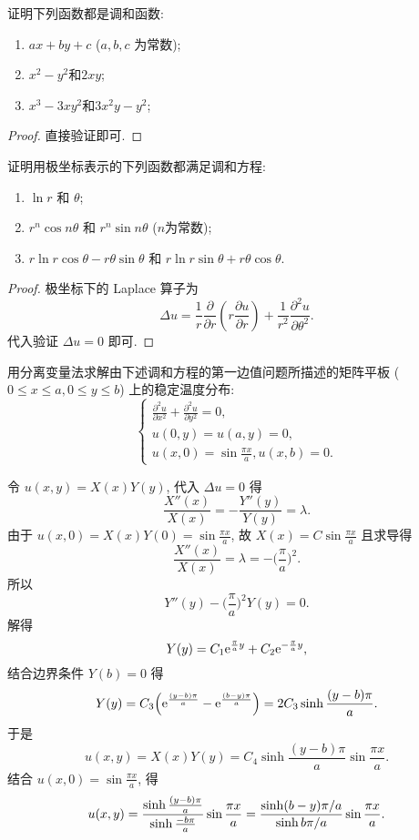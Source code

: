 \begin{exercise}
  证明下列函数都是调和函数:
  \begin{enumerate}[(1)]
    \item $ax+by+c$ ($a,b,c$ 为常数);
    \item $x^2-y^2$和$2xy$;
    \item $x^3-3xy^2$和$3x^2y-y^2$;
  \end{enumerate}
\end{exercise}

\begin{proof}
  直接验证即可.
\end{proof}



\begin{exercise}
  证明用极坐标表示的下列函数都满足调和方程:
  \begin{enumerate}[(1)]
    \item $\ln r$ 和 $\theta$;
    \item $r^n\cos n\theta$ 和 $r^n\sin n\theta$ ($n$为常数);
    \item $r\ln r\cos\theta-r\theta\sin\theta$ 和 $r\ln r\sin\theta+r\theta\cos\theta$.
  \end{enumerate}
\end{exercise}

\begin{proof}
  极坐标下的 Laplace 算子为
  \[\Delta u = \frac{1}{r}\frac{\partial}{\partial r}\left(r\frac{\partial u}{\partial r}\right)
    + \frac{1}{r^2}\frac{\partial^2u}{\partial\theta^2}.\]
  代入验证 $\Delta u=0$ 即可.
\end{proof}


\begin{exercise}
  用分离变量法求解由下述调和方程的第一边值问题所描述的矩阵平板 ($0\leq x\leq a,0\leq y\leq b$)
  上的稳定温度分布:
  \[\begin{cases}
    \displaystyle\frac{\partial^2u}{\partial x^2}+\frac{\partial^2u}{\partial y^2}=0,\\
    u(0,y)=u(a,y)=0,\\
    \displaystyle u(x,0)=\sin\frac{\pi x}{a},u(x,b)=0.
  \end{cases}\]
\end{exercise}

\begin{solve}
  令 $u(x,y)=X(x)Y(y)$, 代入 $\Delta u=0$ 得
  \[\frac{X''(x)}{X(x)} = -\frac{Y''(y)}{Y(y)} = \lambda.\]
  由于 $\displaystyle u(x,0) = X(x)Y(0) = \sin\frac{\pi x}{a}$, 故 $X(x) = C\sin\frac{\pi x}{a}$ 且求导得
  \[\frac{X''(x)}{X(x)} = \lambda = -\biggl(\frac{\pi}{a}\biggr)^2.\]
  所以
  \[Y''(y) - \biggl(\frac{\pi}{a}\biggr)^2 Y(y) = 0.\]
  解得
  \[Y(y) = C_1 \mathrm{e}^{\frac{\pi}{a}y} + C_2 \mathrm{e}^{-\frac{\pi}{a}y},\]
  结合边界条件 $Y(b) = 0$ 得
  \[Y(y) = C_3 \Bigl(\mathrm{e}^{\frac{(y-b)\pi}{a}} - \mathrm{e}^{\frac{(b-y)\pi}{a}}\Bigr)
    = 2C_3 \sinh\frac{(y-b)\pi}{a}.\]
  于是
  \[u(x,y) = X(x)Y(y) = C_4 \sinh\frac{(y-b)\pi}{a} \sin\frac{\pi x}{a}.\]
  结合 $\displaystyle u(x,0) = \sin\frac{\pi x}{a}$, 得
  \[u(x,y) = \frac{\sinh \frac{(y-b)\pi}{a}}{\sinh \frac{-b\pi}{a}} \sin\frac{\pi x}{a}
    = \frac{\sinh (b-y)\pi/a}{\sinh b\pi/a} \sin\frac{\pi x}{a}.\qedhere\]
\end{solve}


